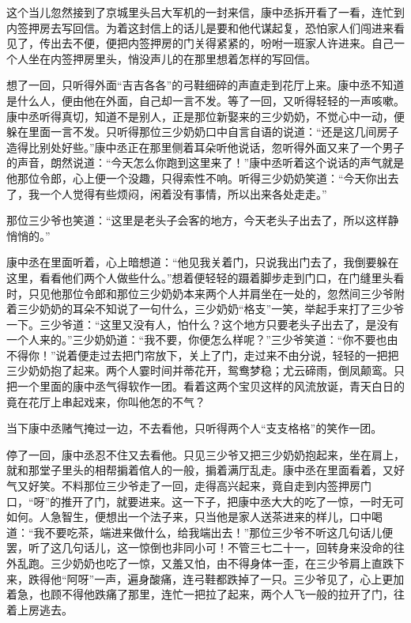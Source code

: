 \documentclass[12pt,UTF8]{ctexbook}
\begin{document}
{{{这个当儿忽然接到了京城里头吕大军机的一封来信，康中丞拆开看了一看，连忙到内签押房去写回信。为着这封信上的话儿是要和他代谋起复，恐怕家人们闯进来看见了，传出去不便，便把内签押房的门关得紧紧的，吩咐一班家人许进来。自己一个人坐在内签押房里头，悄没声儿的在那里想着怎样的写回信。

想了一回，只听得外面“吉吉各各”的弓鞋细碎的声直走到花厅上来。康中丞不知道是什么人，便由他在外面，自己却一言不发。等了一回，又听得轻轻的一声咳嗽。康中丞听得真切，知道不是别人，正是那位新娶来的三少奶奶，不觉心中一动，便躲在里面一言不发。只听得那位三少奶奶口中自言自语的说道：“还是这几间房子造得比别处好些。”康中丞正在那里侧着耳朵听他说话，忽听得外面又来了一个男子的声音，朗然说道：“今天怎么你跑到这里来了！”康中丞听着这个说话的声气就是他那位令郎，心上便一个没趣，只得索性不响。听得三少奶奶笑道：“今天你出去了，我一个人觉得有些烦闷，闲着没有事情，所以出来各处走走。”

那位三少爷也笑道：“这里是老头子会客的地方，今天老头子出去了，所以这样静悄悄的。”

康中丞在里面听着，心上暗想道：“他见我关着门，只说我出门去了，我倒要躲在这里，看看他们两个人做些什么。”想着便轻轻的蹑着脚步走到门口，在门缝里头看时，只见他那位令郎和那位三少奶奶本来两个人并肩坐在一处的，忽然间三少爷附着三少奶奶的耳朵不知说了一句什么，三少奶奶“格支”一笑，举起手来打了三少爷一下。三少爷道：“这里又没有人，怕什么？这个地方只要老头子出去了，是没有一个人来的。”三少奶奶道：“我不要，你便怎么样呢？”三少爷笑道：“你不要也由不得你！”说着便走过去把门帘放下，关上了门，走过来不由分说，轻轻的一把把三少奶奶抱了起来。两个人霎时间并蒂花开，鸳鸯梦稳；尤云碲雨，倒凤颠鸾。只把一个里面的康中丞气得软作一团。看着这两个宝贝这样的风流放诞，青天白日的竟在花厅上串起戏来，你叫他怎的不气？

当下康中丞赌气掩过一边，不去看他，只听得两个人“支支格格”的笑作一团。

停了一回，康中丞忍不住又去看他。只见三少爷又把三少奶奶抱起来，坐在肩上，就和那堂子里头的相帮掮着倌人的一般，掮着满厅乱走。康中丞在里面看着，又好气又好笑。不料那位三少爷走了一回，走得高兴起来，竟自走到内签押房门口，“呀”的推开了门，就要进来。这一下子，把康中丞大大的吃了一惊，一时无可如何。人急智生，便想出一个法子来，只当他是家人送茶进来的样儿，口中喝道：“我不要吃茶，端进来做什么，给我端出去！”那位三少爷不听这几句话儿便罢，听了这几句话儿，这一惊倒也非同小可！不管三七二十一，回转身来没命的往外乱跑。三少奶奶也吃了一惊，又羞又怕，由不得身体一歪，在三少爷肩上直跌下来，跌得他“阿呀”一声，遍身酸痛，连弓鞋都跌掉了一只。三少爷见了，心上更加着急，也顾不得他跌痛了那里，连忙一把拉了起来，两个人飞一般的拉开了门，往着上房逃去。

}}}
\end{document}

